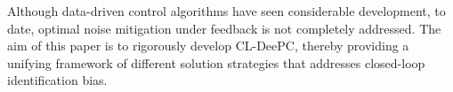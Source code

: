 Although data-driven control algorithms have seen considerable development, to date, optimal noise mitigation under feedback is not completely addressed.
The aim of this paper is to rigorously develop \ac{CL-DeePC}, thereby providing a unifying framework of different solution strategies that addresses closed-loop identification bias. %
%
%

